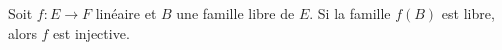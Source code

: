 Soit $f : E \to F$ linéaire et $B$  une famille libre de $E$. Si la famille $f(B)$ est libre, alors $f$ est injective.

\begin{reponses}
\end{reponses}

